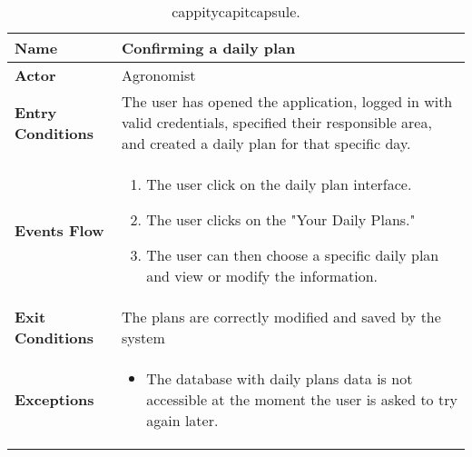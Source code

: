 
\begin{table}[hbt!]
\centering
\caption{\label{tab:addOne{table_counter}}cappitycapitcapsule.}
\renewcommand{\arraystretch}{1.25}

\begin{tabular}{|l|>{\raggedright\arraybackslash}m{12cm}|}

    \hline
    \textbf{Name} & Confirming a daily plan\\
    \hline
   	\textbf{Actor} & Agronomist\\
    \hline
    \textbf{Entry Conditions} & The user has opened the application, logged in with valid credentials, specified their responsible area, and created a daily plan for that specific day.\\
    \hline
    \textbf{Events Flow} & \begin{enumerate}
            \item The user click on the daily plan interface.
            \item The user clicks on the "Your Daily Plans."
            \item The user can then choose a specific daily plan and view or modify the information.
       \end{enumerate}\\
    \hline
    \textbf{Exit Conditions} & The plans are correctly modified and saved by the system\\
    \hline
    \textbf{Exceptions} & 
       \begin{itemize}
          \item The database with daily plans data is not accessible at the moment the user is asked to try again later.
        \end{itemize}
     \\
    \hline
\end{tabular}
\end{table}